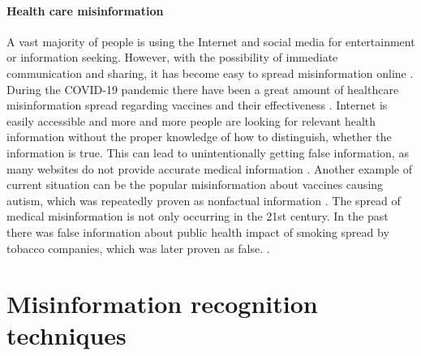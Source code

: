 \documentclass[11pt ,english,a4paper]{article}
\begin{document}



\paragraph{Health care misinformation}
A vast majority of people is using the Internet and social media for entertainment or information seeking. However, with the possibility of immediate communication and sharing, it has become easy to spread misinformation online \cite{wa19sys}. During the COVID-19 pandemic there have been a great amount of healthcare misinformation spread regarding vaccines and their effectiveness \cite{chap22unmask}. Internet is easily accessible and more and more people are looking for relevant health information without the proper knowledge of how to distinguish, whether the information is true. This can lead to unintentionally getting false information, as many websites do not provide accurate medical information \cite{cook15misinfo}. Another example of current situation can be the popular misinformation about vaccines causing autism, which was repeatedly proven as nonfactual information \cite{wa19sys}. 
The spread of medical misinformation is not only occurring in the 21st century. In the past there was false information about public health impact of smoking spread by tobacco companies, which was later proven as false. \cite{cook15misinfo}.

\section{Misinformation recognition techniques} \label{tech}
\end{document}
